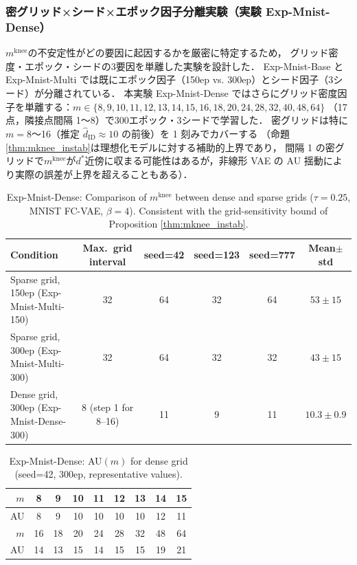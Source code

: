 \documentclass[11pt,a4paper]{jsarticle}
\newcommand{\mknee}{m^{\mathrm{knee}}}
\begin{document}
\subsubsection{密グリッド×シード×エポック因子分離実験（実験 Exp-Mnist-Dense）}\label{sec:exp_el}

$\mknee$の不安定性がどの要因に起因するかを厳密に特定するため，
グリッド密度・エポック・シードの3要因を単離した実験を設計した．
Exp-Mnist-Base と Exp-Mnist-Multi では既にエポック因子（150ep vs. 300ep）とシード因子（3シード）が分離されている．
本実験 Exp-Mnist-Dense ではさらにグリッド密度因子を単離する：$m \in \{8,9,10,11,12,13,14,15,16,18,20,24,28,32,40,48,64\}$
（17点，隣接点間隔 1〜8）で300エポック・3シードで学習した．
密グリッドは特に$m = 8$〜16（推定 $\hat{d}_\mathrm{ID} \approx 10$ の前後）を 1 刻みでカバーする
（命題\ref{thm:mknee_instab}は理想化モデルに対する補助的上界であり，
間隔 1 の密グリッドで$\mknee$が$d^*$近傍に収まる可能性はあるが，非線形 VAE の AU 揺動により実際の誤差が上界を超えることもある）．

\begin{table}[H]
\centering
\caption{Exp-Mnist-Dense: Comparison of $\mknee$ between dense and sparse grids ($\tau=0.25$, MNIST FC-VAE, $\beta=4$). Consistent with the grid-sensitivity bound of Proposition \ref{thm:mknee_instab}.}
\label{tab:el_mknee}
\small
\begin{tabular}{lccccc}
\toprule
Condition & Max.\ grid interval & seed=42 & seed=123 & seed=777 & Mean$\pm$std \\
\midrule
Sparse grid, 150ep (Exp-Mnist-Multi-150) & 32 & 64 & 32 & 64 & $53 \pm 15$ \\
Sparse grid, 300ep (Exp-Mnist-Multi-300) & 32 & 64 & 32 & 32 & $43 \pm 15$ \\
Dense grid, 300ep (Exp-Mnist-Dense-300) & 8 (step 1 for 8--16) & 11 & 9 & 11 & $10.3 \pm 0.9$ \\
\bottomrule
\end{tabular}
\end{table}

\begin{table}[H]
\centering
\caption{Exp-Mnist-Dense: AU$(m)$ for dense grid (seed=42, 300ep, representative values).}
\label{tab:el_au}
\small
\begin{tabular}{rcccccccc}
\toprule
$m$ & 8 & 9 & 10 & 11 & 12 & 13 & 14 & 15 \\
\midrule
AU & 8 & 9 & 10 & 10 & 10 & 10 & 12 & 11 \\
\midrule
$m$ & 16 & 18 & 20 & 24 & 28 & 32 & 48 & 64 \\
\midrule
AU & 14 & 13 & 15 & 14 & 15 & 15 & 19 & 21 \\
\bottomrule
\end{tabular}
\end{table}
\end{document}
